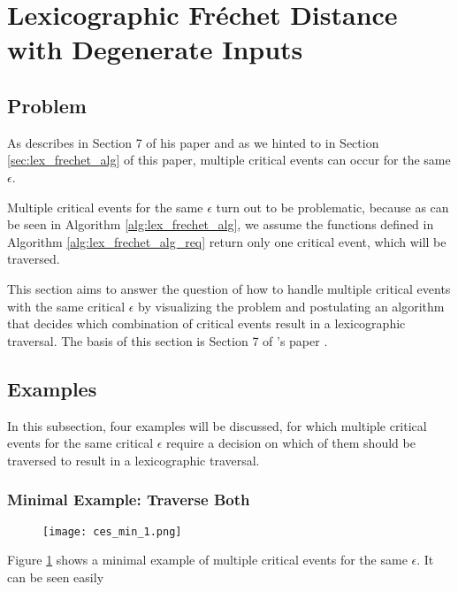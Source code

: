 
\section{Lexicographic Fréchet Distance with Degenerate Inputs}\label{lex_frechet_deg}

\subsection{Problem}

As \citeauthor{rotelex} describes in Section 7 of his paper  and as we hinted to in Section \ref{sec:lex_frechet_alg} of this paper, multiple critical events can occur for the same $\epsilon$.

Multiple critical events for the same $\epsilon$ turn out to be problematic, because as can be seen in Algorithm \ref{alg:lex_frechet_alg}, we assume the functions defined in Algorithm \ref{alg:lex_frechet_alg_req} return only one critical event, which will be traversed.

This section aims to answer the question of how to handle multiple critical events with the same critical $\epsilon$ by visualizing the problem and postulating an algorithm that decides which combination of critical events result in a lexicographic traversal. The basis of this section is Section 7 of \citeauthor{rotelex}'s paper \cite{rotelex}.


\subsection{Examples}

In this subsection, four examples will be discussed, for which multiple critical events for the same critical $\epsilon$ require a decision on which of them should be traversed to result in a lexicographic traversal.


\subsubsection{Minimal Example: Traverse Both}

\begin{figure}[H]
    \centering
    
	\texttt{[image: ces\_min\_1.png]}
	
	\caption{}
    \label{fig:ces_min_1}
\end{figure}

Figure \ref{fig:ces_min_1} shows a minimal example of multiple critical events for the same $\epsilon$. It can be seen easily


